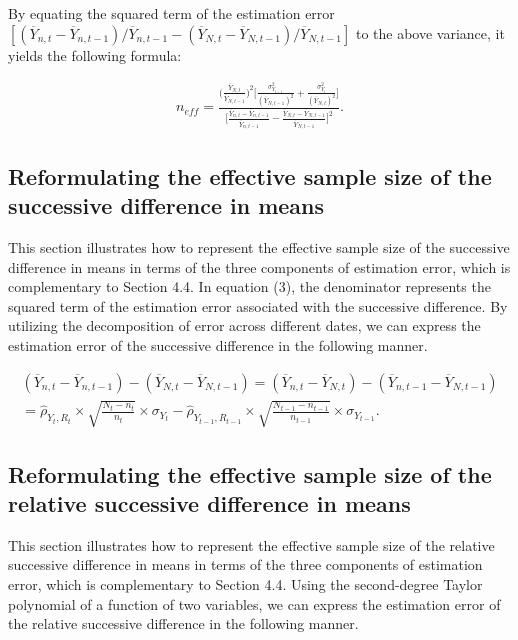 \documentclass{article}
\begin{document}
\noindent By equating the squared term of the estimation error $[(\overline{Y}_{n,t} - \overline{Y}_{n,t-1}) \slash \overline{Y}_{n,t-1} - (\overline{Y}_{N,t} - \overline{Y}_{N,t-1}) \slash \overline{Y}_{N,t-1}]$ to the above variance, it yields the following formula:

\begin{align*}
     n_{eff} = \frac{\Big(\frac{\overline{Y}_{N,t}}{\overline{Y}_{N,t-1}}\Big)^2\big[\frac{\sigma_{Y_{t-1}}^2}{(\overline{Y}_{N,t-1})^2} + \frac{\sigma_{Y_t}^2}{(\overline{Y}_{N,t})^2}\big]} {\big[\frac{\overline{Y}_{n,t} - \overline{Y}_{n,t-1}}{\overline{Y}_{n,t-1}} - \frac{\overline{Y}_{N,t} - \overline{Y}_{N,t-1}}{\overline{Y}_{N,t-1}}\big]^2}.
\end{align*}

\subsection{Reformulating the effective sample size of the successive difference in means}

This section illustrates how to represent the effective sample size of the successive difference in means in terms of the three components of estimation error, which is complementary to Section 4.4. In equation (3), the denominator represents the squared term of the estimation error associated with the successive difference. By utilizing the decomposition of error across different dates, we can express the estimation error of the successive difference in the following manner. 

\begin{align*}
    (\overline{Y}_{n,t} - \overline{Y}_{n,t-1})-(\overline{Y}_{N,t} - \overline{Y}_{N,t-1}) = (\overline{Y}_{n,t} - \overline{Y}_{N,t})-(\overline{Y}_{n,t-1} - \overline{Y}_{N,t-1}) \\ = \hat{\rho}_{Y_t, R_t} \times \sqrt{\frac{N_t - n_t}{n_t}} \times \sigma_{Y_t} -\hat{\rho}_{Y_{t-1}, R_{t-1}} \times \sqrt{\frac{N_{t-1} - n_{t-1}}{n_{t-1}}} \times \sigma_{Y_{t-1}}.
\end{align*}

\subsection{Reformulating the effective sample size of the relative successive difference in means}

This section illustrates how to represent the effective sample size of the relative successive difference in means in terms of the three components of estimation error, which is complementary to Section 4.4. Using the second-degree Taylor polynomial of a function of two variables, we can express the estimation error of the relative successive difference in the following manner. 
\end{document}
